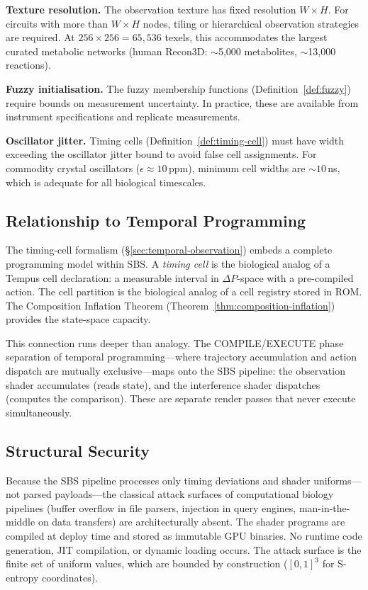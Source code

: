 \documentclass[11pt,twocolumn,a4paper]{article}
\newcommand{\DP}{\Delta P}
\begin{document}
\textbf{Texture resolution.}  The observation texture has fixed
resolution $W \times H$.  For circuits with more than $W \times H$
nodes, tiling or hierarchical observation strategies are required.
At $256 \times 256 = 65{,}536$ texels, this accommodates the largest
curated metabolic networks (human Recon3D: $\sim$5{,}000 metabolites,
$\sim$13{,}000 reactions).

\textbf{Fuzzy initialisation.}  The fuzzy membership functions
(Definition~\ref{def:fuzzy}) require bounds on measurement
uncertainty.  In practice, these are available from instrument
specifications and replicate measurements.

\textbf{Oscillator jitter.}  Timing cells
(Definition~\ref{def:timing-cell}) must have width exceeding the
oscillator jitter bound to avoid false cell assignments.  For commodity
crystal oscillators ($\epsilon \approx 10$\,ppm), minimum cell widths
are $\sim\!10$\,ns, which is adequate for all biological
timescales.

\subsection{Relationship to Temporal Programming}

The timing-cell formalism (\S\ref{sec:temporal-observation}) embeds a
complete programming model within SBS.  A \emph{timing cell} is the
biological analog of a Tempus cell declaration: a measurable interval
in $\DP$-space with a pre-compiled action.  The cell partition is
the biological analog of a cell registry stored in ROM.  The
Composition Inflation Theorem
(Theorem~\ref{thm:composition-inflation}) provides the state-space
capacity.

This connection runs deeper than analogy.  The COMPILE/EXECUTE phase
separation of temporal programming---where trajectory accumulation and
action dispatch are mutually exclusive---maps onto the SBS pipeline:
the observation shader accumulates (reads state), and the interference
shader dispatches (computes the comparison).  These are separate render
passes that never execute simultaneously.

\subsection{Structural Security}

Because the SBS pipeline processes only timing deviations and shader
uniforms---not parsed payloads---the classical attack surfaces of
computational biology pipelines (buffer overflow in file parsers,
injection in query engines, man-in-the-middle on data transfers) are
architecturally absent.  The shader programs are compiled at deploy
time and stored as immutable GPU binaries.  No runtime code generation,
JIT compilation, or dynamic loading occurs.  The attack surface is the
finite set of uniform values, which are bounded by construction
($[0,1]^3$ for S-entropy coordinates).
\end{document}
